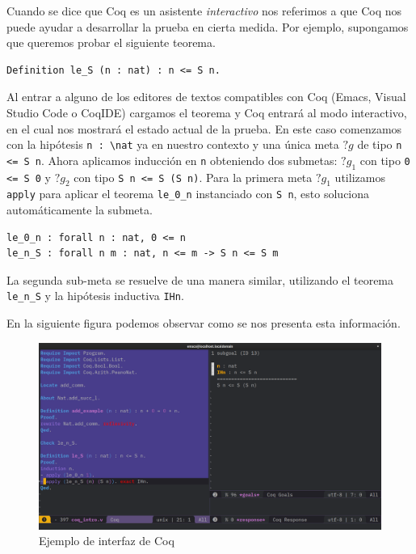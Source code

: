 Cuando se dice que Coq es un asistente \textit{interactivo} nos referimos a que Coq nos puede ayudar a desarrollar la prueba en cierta medida.
Por ejemplo, supongamos que queremos probar el siguiente teorema.

\begin{lstlisting}[frame=tb,caption={Teorema ejemplo},label=lst:le_S]
Definition le_S (n : nat) : n <= S n.
\end{lstlisting}

Al entrar a alguno de los editores de textos compatibles con Coq (Emacs, Visual Studio Code o CoqIDE) cargamos el teorema y Coq entrará al modo interactivo, en el cual nos mostrará el estado actual de la prueba.
En este caso comenzamos con la hipótesis \lstinline{n : \nat} ya en nuestro contexto y una única meta $?g$ de tipo \lstinline{n <= S n}.
Ahora aplicamos inducción en \lstinline{n} obteniendo dos submetas: $?g_1$ con tipo \lstinline{0 <= S 0} y $?g_2$ con tipo \lstinline{S n <= S (S n)}.
Para la primera meta $?g_1$ utilizamos \lstinline{apply} para aplicar el teorema \lstinline{le_0_n} instanciado con \lstinline{S n}, esto soluciona automáticamente la submeta.

\begin{lstlisting}[caption={Teoremas \lstinline{le_0_n} y \lstinline{le_n_S}}]
le_0_n : forall n : nat, 0 <= n
le_n_S : forall n m : nat, n <= m -> S n <= S m
\end{lstlisting}

La segunda sub-meta se resuelve de una manera similar, utilizando el teorema \lstinline{le_n_S} y la hipótesis inductiva \lstinline{IHn}.

En la siguiente figura podemos observar como se nos presenta esta información.

\begin{figure}[h]
  \centering
  \includegraphics[width=1\textwidth]{gfx/coq_emacs_example.png}
  \caption{Ejemplo de interfaz de Coq}
  \label{fig:ui}
\end{figure}

